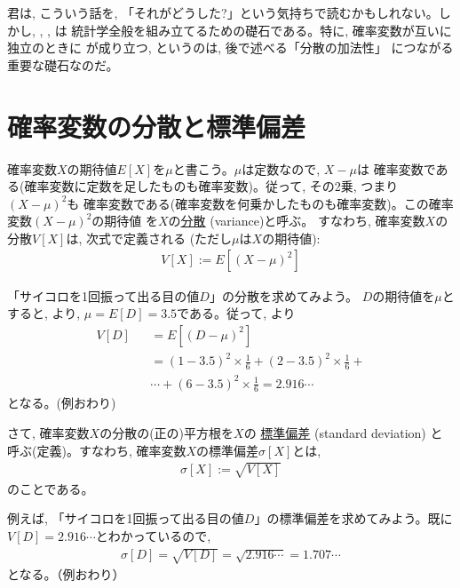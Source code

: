 君は, こういう話を, 「それがどうした?」という気持ちで読むかもしれない。しかし, 
, , は
統計学全般を組み立てるための礎石である。特に, 確率変数が互いに独立のときに
が成り立つ, というのは, 後で述べる「分散の加法性」
につながる重要な礎石なのだ。
\vv



\section{確率変数の分散と標準偏差}

確率変数$X$の期待値$E[X]$を$\mu$と書こう。$\mu$は定数なので, $X-\mu$は
確率変数である(確率変数に定数を足したものも確率変数)。従って, その2乗, つまり$(X-\mu)^2$も
確率変数である(確率変数を何乗かしたものも確率変数)。この確率変数$(X-\mu)^2$の期待値
を$X$の\underline{分散}  (variance)と呼ぶ。
すなわち, 確率変数$X$の分散$V[X]$は, 次式で定義される (ただし$\mu$は$X$の期待値):
\begin{eqnarray}
V[X]:=E[(X-\mu)^2]\label{eq:defvar}
\end{eqnarray}

\begin{exmpl} 「サイコロを1回振って出る目の値$D$」の分散を求めてみよう。
$D$の期待値を$\mu$とすると, 
より, $\mu=E[D]=3.5$である。従って, より
\begin{eqnarray*}
V[D]&&=E[(D-\mu)^2]\\
&&=(1-3.5)^2\times\frac{1}{6}+(2-3.5)^2\times\frac{1}{6}+\\
&&\cdots+(6-3.5)^2\times\frac{1}{6}=2.916\cdots
\end{eqnarray*}
となる。(例おわり)\end{exmpl}
\mv

さて, 確率変数$X$の分散の(正の)平方根を$X$の
\underline{標準偏差}  (standard deviation)
と呼ぶ(定義)。すなわち, 確率変数$X$の標準偏差$\sigma[X]$とは, 
\begin{eqnarray}
\sigma[X]:=\sqrt{V[X]}\label{eq:defsd}
\end{eqnarray}
のことである。
\mv

\begin{exmpl}
例えば, 「サイコロを1回振って出る目の値$D$」の標準偏差を求めてみよう。既に$V[D]=2.916\cdots$とわかっているので, 
\begin{eqnarray}
\sigma[D]=\sqrt{V[D]}=\sqrt{2.916\cdots}=1.707\cdots
\end{eqnarray}
となる。（例おわり）\end{exmpl}
\mv

